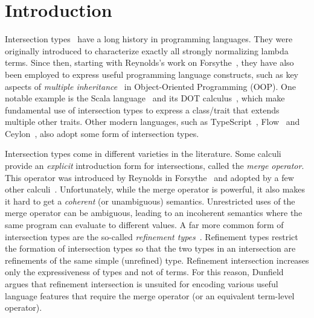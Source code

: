 
\section{Introduction}
\label{sec:intro}

Intersection types~\cite{pottinger1980type,coppo1981functional} have a long
history in programming languages. They were originally introduced to
characterize exactly all strongly normalizing lambda terms. Since then,
starting with Reynolds's work on
Forsythe~\cite{reynolds1988preliminary}, they have also been employed
to express useful programming language constructs, such as key
aspects of \emph{multiple inheritance}~\cite{compagnoni1996higher} in
Object-Oriented Programming (OOP). One notable
example is the Scala
language~\cite{odersky2004overview} and its DOT
calculus~\cite{amin2012dependent}, which make fundamental use of intersection
types to express a class/trait that extends multiple other traits. Other
modern languages, such as TypeScript~\cite{typescript}, Flow~\cite{flow} and
Ceylon~\cite{ceylon}, also adopt some form of intersection types.

Intersection types come in different varieties in the literature. Some calculi
provide an \emph{explicit} introduction form for intersections, called the
\emph{merge operator}. This operator was introduced by Reynolds in Forsythe~\cite{reynolds1988preliminary} and
adopted by a few other calculi~\cite{Castagna_1992,
  dunfield2014elaborating, oliveira2016disjoint, alpuimdisjoint}. Unfortunately,
while the merge operator is powerful, it also makes it hard to get a \emph{coherent}
(or unambiguous) semantics. 
Unrestricted uses of the merge operator can be ambiguous, leading to an incoherent semantics
where the same program can evaluate to different values. 
A far more common form of intersection types are the so-called \emph{refinement
  types}~\cite{Freeman_1991, Davies_2000, dunfield2003type}. Refinement types
restrict the formation of intersection types so that the two types in an
intersection are refinements of the same simple (unrefined) type. Refinement
intersection increases only the expressiveness of types and not of terms. 
For this reason, Dunfield~\cite{dunfield2014elaborating} argues that refinement
intersection is unsuited for encoding various useful language features
that require the merge operator (or an equivalent term-level operator).

